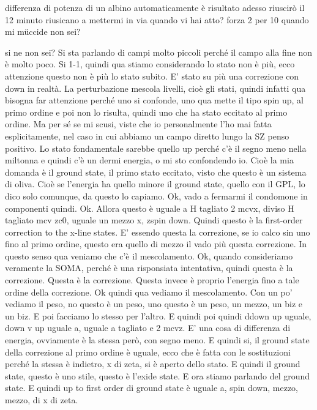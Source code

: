 \begin{soluzione}
differenza di potenza di un albino automaticamente è risultato adesso riuscirò il 12 minuto riusicano a mettermi in via quando vi hai atto? forza 2 per 10 quando mi müccide non sei?
   
   si ne non sei? Si sta parlando di campi molto piccoli perché il campo alla fine non è molto poco. Si 1-1, quindi qua stiamo considerando lo stato non è più, ecco attenzione questo non è più lo stato subito. E' stato su più una correzione con down in realtà. La perturbazione mescola livelli, cioè gli stati, quindi infatti qua bisogna far attenzione perché uno si confonde, uno qua mette il tipo spin up, al primo ordine e poi non lo risulta, quindi uno che ha stato eccitato al primo ordine. Ma per sé se mi scusi, viste che io personalmente l'ho mai fatta esplicitamente, nel caso in cui abbiamo un campo diretto lungo la SZ penso positivo. Lo stato fondamentale sarebbe quello up perché c'è il segno meno nella miltonna e quindi c'è un dermi energia, o mi sto confondendo io. Cioè la mia domanda è il ground state, il primo stato eccitato, visto che questo è un sistema di oliva. Cioè se l'energia ha quello minore il ground state, quello con il GPL, lo dico solo comunque, da questo lo capiamo. Ok, vado a fermarmi il condomone in componenti quindi. Ok. Allora questo è uguale a H tagliato 2 mcvx, diviso H tagliato mcv zc0, uguale un mezzo x, zspin down. Quindi questo è la first-order correction to the x-line states. E' essendo questa la correzione, se io calco sin uno fino al primo ordine, questo era quello di mezzo il vado più questa correzione. In questo senso qua veniamo che c'è il mescolamento. Ok, quando consideriamo veramente la SOMA, perché è una risponsiata intentativa, quindi questa è la correzione. Questa è la correzione. Questa invece è proprio l'energia fino a tale ordine della correzione. Ok quindi qua vediamo il mescolamento. Con un po' vediamo il peso, no questo è un peso, uno questo è un peso, un mezzo, un biz e un biz. E poi facciamo lo stesso per l'altro. E quindi poi quindi ddown up uguale, down v up uguale a, uguale a tagliato e 2 mcvz. E' una cosa di differenza di energia, ovviamente è la stessa però, con segno meno. E quindi si, il ground state della correzione al primo ordine è uguale, ecco che è fatta con le sostituzioni perché la stessa è indietro, x di zeta, si è aperto dello stato. E quindi il ground state, questo è uno stile, questo è l'exide state. E ora stiamo parlando del ground state. E quindi up to first order di ground state è uguale a, spin down, mezzo, mezzo, di x di zeta. 
   

\end{soluzione}
